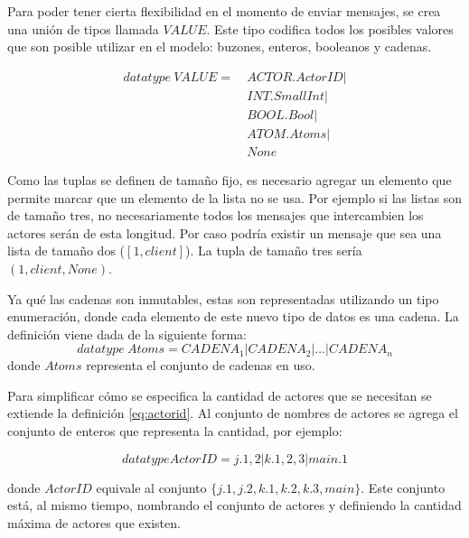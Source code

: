 
Para poder tener cierta flexibilidad en el momento de enviar mensajes, se crea una unión de tipos llamada $VALUE$. Este tipo codifica todos los posibles valores que son posible utilizar en el modelo: buzones, enteros, booleanos y cadenas. 

\begin{align*}
datatype\ VALUE =\ & ACTOR.ActorID | \\
& INT.SmallInt | \\
& BOOL.Bool |  \\
& ATOM.Atoms | \\
& None
\end{align*}


Como las tuplas se definen de tamaño fijo, es necesario agregar un elemento que permite marcar que un elemento de la lista no se usa. Por ejemplo si las listas son de tamaño tres, no necesariamente todos los mensajes que intercambien los actores serán de esta longitud. Por caso podría existir un mensaje que sea una lista de tamaño dos ($[1, client]$). La tupla de tamaño tres sería $(1, client, None)$. 

Ya qué las cadenas son inmutables, estas son representadas utilizando un tipo enumeración, donde cada elemento de este nuevo tipo de datos es una cadena. La definición viene dada de la siguiente forma:
\begin{equation*}
  datatype\ Atoms = CADENA_1 | CADENA_2 | \ldots | CADENA_n	
\end{equation*}
donde $Atoms$ representa el conjunto de cadenas en uso.

Para simplificar cómo se especifica la cantidad de actores que se necesitan se extiende la definición \eqref{eq:actorid}. Al conjunto de nombres de actores se agrega el conjunto de enteros que representa la cantidad, por ejemplo:

\[
  datatype ActorID = j.{1,2} | k.{1,2,3} | main.{1}
\]

donde $ActorID$ equivale al conjunto $\{j.1, j.2, k.1, k.2, k.3, main\}$. Este conjunto está, al mismo tiempo, nombrando el conjunto de actores y definiendo la cantidad máxima de actores que existen.

